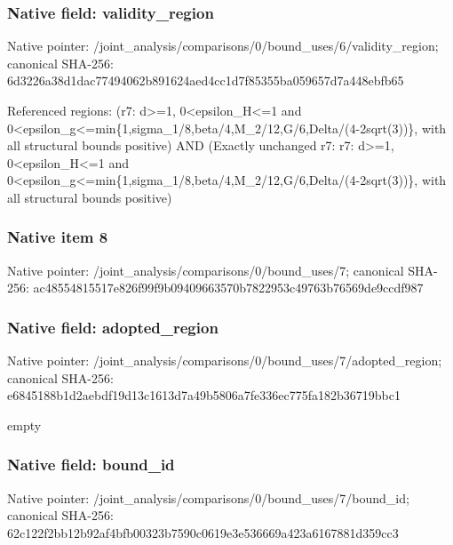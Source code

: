 \documentclass[10pt,a4paper]{article}
\begin{document}
\subsubsection{Native field: validity\_\allowbreak{}region}
Native pointer: /joint\_\allowbreak{}analysis/comparisons/0/bound\_\allowbreak{}uses/6/validity\_\allowbreak{}region; canonical SHA-256: 6d3226a38d1dac77494062b891624aed4cc1d7f85355ba059657d7a448ebfb65

\begingroup\raggedright\sloppy Referenced regions:\allowbreak{} (r7:\allowbreak{} d>=\allowbreak{}1,\allowbreak{} 0<epsilon\_\allowbreak{}H<=\allowbreak{}1 and 0<epsilon\_\allowbreak{}g<=\allowbreak{}min\{1,\allowbreak{}sigma\_\allowbreak{}1/\allowbreak{}8,\allowbreak{}beta/\allowbreak{}4,\allowbreak{}M\_\allowbreak{}2/\allowbreak{}12,\allowbreak{}G/\allowbreak{}6,\allowbreak{}Delta/\allowbreak{}(4-2sqrt(3))\},\allowbreak{} with all structural bounds positive) AND (Exactly unchanged r7:\allowbreak{} r7:\allowbreak{} d>=\allowbreak{}1,\allowbreak{} 0<epsilon\_\allowbreak{}H<=\allowbreak{}1 and 0<epsilon\_\allowbreak{}g<=\allowbreak{}min\{1,\allowbreak{}sigma\_\allowbreak{}1/\allowbreak{}8,\allowbreak{}beta/\allowbreak{}4,\allowbreak{}M\_\allowbreak{}2/\allowbreak{}12,\allowbreak{}G/\allowbreak{}6,\allowbreak{}Delta/\allowbreak{}(4-2sqrt(3))\},\allowbreak{} with all structural bounds positive)\par\endgroup

\subsubsection{Native item 8}
Native pointer: /joint\_\allowbreak{}analysis/comparisons/0/bound\_\allowbreak{}uses/7; canonical SHA-256: ac48554815517e826f99f9b09409663570b7822953c49763b76569de9ccdf987

\subsubsection{Native field: adopted\_\allowbreak{}region}
Native pointer: /joint\_\allowbreak{}analysis/comparisons/0/bound\_\allowbreak{}uses/7/adopted\_\allowbreak{}region; canonical SHA-256: e6845188b1d2aebdf19d13c1613d7a49b5806a7fe336ec775fa182b36719bbc1

\begingroup\raggedright\sloppy empty\par\endgroup

\subsubsection{Native field: bound\_\allowbreak{}id}
Native pointer: /joint\_\allowbreak{}analysis/comparisons/0/bound\_\allowbreak{}uses/7/bound\_\allowbreak{}id; canonical SHA-256: 62c122f2bb12b92af4bfb00323b7590c0619e3e536669a423a6167881d359cc3
\end{document}
